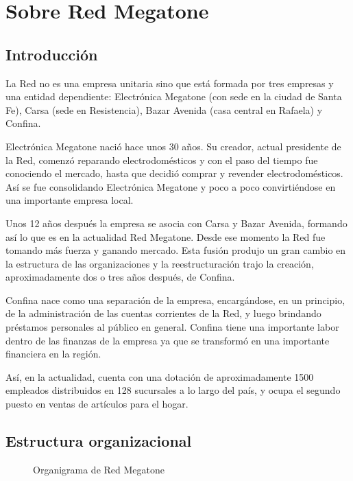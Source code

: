 \section{Sobre Red Megatone}


\subsection{Introducción}

La Red no es una empresa unitaria sino que está formada por tres empresas y una
entidad dependiente: Electrónica Megatone (con sede en la ciudad de Santa Fe),
Carsa (sede en Resistencia), Bazar Avenida (casa central en Rafaela) y Confina.

Electrónica Megatone nació hace unos 30 años. Su creador, actual presidente de
la Red, comenzó reparando electrodomésticos y con el paso del tiempo fue
conociendo el mercado, hasta que decidió comprar y revender electrodomésticos.
Así se fue consolidando Electrónica Megatone y poco a poco convirtiéndose en
una importante empresa local. 

Unos 12 años después la empresa se asocia con Carsa y Bazar Avenida, formando
así lo que es en la actualidad Red Megatone. Desde ese momento la Red fue
tomando más fuerza y ganando mercado. Esta fusión produjo un gran cambio en la
estructura de las organizaciones y la reestructuración trajo la creación,
aproximadamente dos o tres años después, de Confina.

Confina nace como una separación de la empresa, encargándose, en un principio,
de la administración de las cuentas corrientes de la Red, y luego brindando
préstamos personales al público en general. Confina tiene una importante labor
dentro de las finanzas de la empresa ya que se transformó en una importante
financiera en la región.

Así, en la actualidad, cuenta con una dotación de aproximadamente 1500
empleados distribuidos en 128 sucursales a lo largo del país, y ocupa el
segundo puesto en ventas de artículos para el hogar.


\subsection{Estructura organizacional}

\begin{figure}[h]
  \caption{Organigrama de Red Megatone}
  \label{fig:organigrama}
\end{figure}


